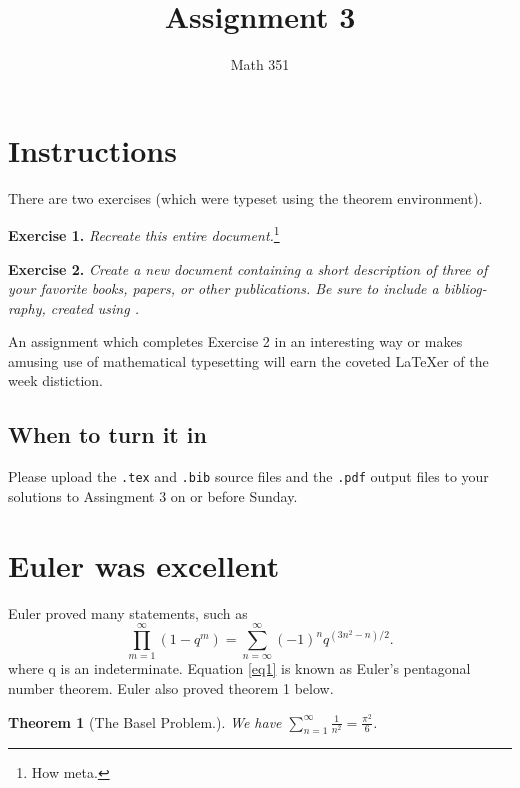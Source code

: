 \documentclass{article}
\title{Assignment 3}
\author{Math 351}
\date{}
\newtheorem{theorem}{Theorem}
\begin{document}
\maketitle

\tableofcontents
\section{Instructions}

There are two exercises (which were typeset using the theorem environment).\newline

\noindent\textbf{Exercise 1.} \emph{Recreate this entire document.}\footnote{How meta.}  \newline

\noindent\textbf{Exercise 2.} \emph{Create a new document containing a short description of three of your favorite books, papers, or other publications. Be sure to include a bibliog-raphy, created using .}  \newline

An assignment which completes Exercise 2 in an interesting way or makes amusing
use of mathematical typesetting will earn the coveted \LaTeX er of the week distiction.

\subsection[Due Date]{When to turn it in}

Please upload the \verb~.tex~ and \verb~.bib~ source files and the \verb~.pdf~ output files
to your solutions to Assingment 3 on or before Sunday.

\section{Euler was excellent}

Euler proved many statements, such as
\begin{equation}
    \prod_{m=1}^{\infty} \left(1-q^m\right) = \sum_{n=\infty}^{\infty} \left(-1\right)^n q^{\left(3n^2-n\right)/2}. \label{eq1}
\end{equation}
where q is an indeterminate. Equation \eqref{eq1} is known as Euler's pentagonal number
theorem. Euler also proved theorem 1 below.

\begin{theorem}[The Basel Problem.]
We have $\displaystyle\sum\limits_{n=1}^{\infty} \frac{1}{n^2} = \frac{\pi^2}{6}$.
\end{theorem}
\end{document}
